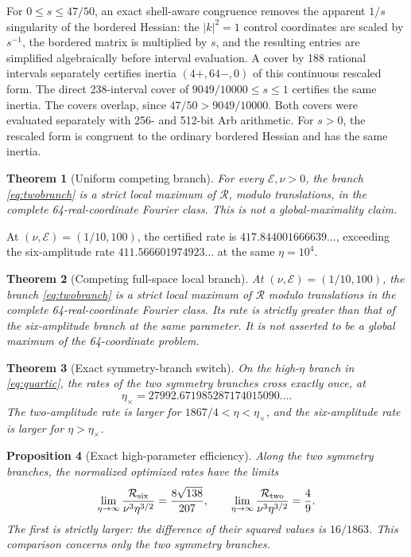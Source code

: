 \documentclass[11pt]{article}
\newtheorem{theorem}{Theorem}[section]
\newtheorem{proposition}[theorem]{Proposition}
\newcommand{\E}{\mathcal{E}}
\newcommand{\rate}{\mathcal{R}}
\begin{document}
For $0\leq s\leq47/50$, an exact shell-aware congruence removes the
apparent $1/s$ singularity of the bordered Hessian: the $|k|^2=1$ control
coordinates are scaled by $s^{-1}$, the bordered matrix is multiplied by
$s$, and the resulting entries are simplified algebraically before interval
evaluation. A cover by 188 rational intervals separately certifies inertia $(4+,64-,0)$
of this continuous rescaled form. The direct 238-interval cover of
$9049/10000\leq s\leq1$ certifies the same inertia. The covers overlap,
since $47/50>9049/10000$. Both covers were evaluated separately with
256- and 512-bit Arb arithmetic. For $s>0$, the rescaled form is congruent to
the ordinary bordered Hessian and has the same inertia.

\begin{theorem}[Uniform competing branch]\label{thm:uniformcompeting}
For every $\E,\nu>0$, the branch
\eqref{eq:twobranch} is a strict local maximum of $\rate$, modulo
translations, in the complete 64-real-coordinate Fourier class. This is not
a global-maximality claim.
\end{theorem}

At $(\nu,\E)=(1/10,100)$, the certified rate is
$417.844001666639\ldots$, exceeding the six-amplitude rate
$411.566601974923\ldots$ at the same $\eta=10^4$.

\begin{theorem}[Competing full-space local branch]\label{thm:competing}
At $(\nu,\E)=(1/10,100)$, the branch \eqref{eq:twobranch} is a strict local
maximum of $\rate$ modulo translations in the complete 64-real-coordinate
Fourier class. Its rate is strictly greater than that of the six-amplitude
branch at the same parameter. It is not asserted to be a global maximum of
the 64-coordinate problem.
\end{theorem}

\begin{theorem}[Exact symmetry-branch switch]\label{thm:switch}
On the high-$\eta$ branch in \eqref{eq:quartic}, the rates of the two symmetry
branches cross exactly once, at
\[\eta_\times=27992.671985287174015090\ldots.\]
The two-amplitude rate is larger for $1867/4<\eta<\eta_\times$, and the
six-amplitude rate is larger for $\eta>\eta_\times$.
\end{theorem}

\begin{proposition}[Exact high-parameter efficiency]\label{prop:efficiency}
Along the two symmetry branches, the normalized optimized rates have the
limits
\[
 \lim_{\eta\to\infty}\frac{\rate_{\rm six}}{\nu^3\eta^{3/2}}
 =\frac{8\sqrt{138}}{207},\qquad
 \lim_{\eta\to\infty}\frac{\rate_{\rm two}}{\nu^3\eta^{3/2}}
 =\frac49.
\]
The first is strictly larger: the difference of their squared values is
$16/1863$.  This comparison concerns only the two symmetry branches.
\end{proposition}
\end{document}
